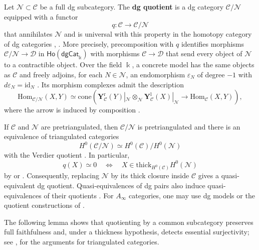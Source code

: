 \documentclass[11pt,letterpaper,reqno]{amsart}
\theoremstyle{plain}
\theoremstyle{definition}
\theoremstyle{plain}
\theoremstyle{definition}
\numberwithin{equation}{section}
\begin{document}
Let $\mathscr N\subset\mathscr C$ be a full dg subcategory.
The \textbf{dg quotient} is a dg category $\mathscr C/\mathscr N$ equipped with a functor
\[
q:\mathscr C\longrightarrow\mathscr C/\mathscr N
\]
that annihilates $\mathscr N$ and is universal with this property in the homotopy category of dg categories \cite[Theorem 1.6.2]{Drinfeld2004}, \cite[Theorem 4.8]{Keller2006b}.
More precisely, precomposition with $q$ identifies morphisms $\mathscr C/\mathscr N\to\mathscr D$ in $\mathsf{Ho}(\mathsf{dgCat}_{\Bbbk})$ with morphisms $\mathscr C\to\mathscr D$ that send every object of $\mathscr N$ to a contractible object.
Over the field $\Bbbk$, a concrete model has the same objects as $\mathscr C$ and freely adjoins, for each $N\in\mathscr N$, an endomorphism $\varepsilon_N$ of degree $-1$ with $d\varepsilon_N=\mathrm{id}_N$ \cite[Section 3.1]{Drinfeld2004}.
Its morphism complexes admit the description
\begin{equation}\label{eq:quotient-Hom}
\mathrm{Hom}_{\mathscr C/\mathscr N}(X,Y)
\simeq\mathrm{cone}\left(
\mathbf Y_{\mathscr C}^{\mathrm r}(Y)|_{\mathscr N}
\otimes_{\mathscr N} 
\mathbf Y_{\mathscr C}^{\mathrm l}(X)|_{\mathscr N}
\longrightarrow\mathrm{Hom}_{\mathscr C}(X,Y)
\right),
\end{equation}
where the arrow is induced by composition \cite[Section 1.3.1]{Drinfeld2004}.

If $\mathscr C$ and $\mathscr N$ are pretriangulated, then $\mathscr C/\mathscr N$ is pretriangulated and there is an equivalence of triangulated categories
\[
H^0(\mathscr C/\mathscr N)\simeq H^0(\mathscr C)/H^0(\mathscr N)
\]
with the Verdier quotient \cite[Theorem 3.4]{Drinfeld2004}.
In particular,
\[
q(X)\simeq0
\quad\Longleftrightarrow\quad
X\in\mathrm{thick}_{H^0(\mathscr C)}H^0(\mathscr N)
\]
by \cite[Remark A.3(ii)]{Drinfeld2004} or \cite[Proposition 4.6.2(3)]{Krause2010}.
Consequently, replacing $\mathscr N$ by its thick closure inside $\mathscr C$ gives a quasi-equivalent dg quotient.
Quasi-equivalences of dg pairs also induce quasi-equivalences of their quotients \cite[Remark 3.6(ii)]{Drinfeld2004}.
For $A_\infty$ categories, one may use dg models or the quotient constructions of \cite{Lyubashenko-Ovsienko2006,Lyubashenko-Manzyuk2008}.

The following lemma shows that quotienting by a common subcategory preserves full faithfulness and, under a thickness hypothesis, detects essential surjectivity; see \cite[Lemma A.5]{Drinfeld2004},\cite[Proposition 4.6.2, Lemma 4.7.1]{Krause2010} for the arguments for triangulated categories.
\end{document}
